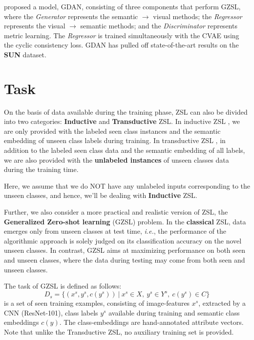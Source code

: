 \documentclass{article}
\begin{document}
\citet{changhu} proposed a model, GDAN, consisting of three components that perform GZSL, where 
the \textit{Generator} represents the semantic $\rightarrow$ visual methods; 
the \textit{Regressor} represents the visual $\rightarrow$ semantic methods; and 
the \textit{Discriminator} represents metric learning. The \textit{Regressor} is trained simultaneously with the CVAE using the cyclic consistency loss.
GDAN has pulled off state-of-the-art results on the \textbf{SUN} \citep{sun} dataset. 



\section{Task}
\label{task}
On the basis of data available during the training phase, ZSL can also be divided into two categories: \textbf{Inductive} and \textbf{Transductive} ZSL. 
In inductive ZSL \citep{sabr10, sabr14, sabr12, sabr17, sabr23, sabr29, sabr3, sabr25}, we are only provided with the labeled seen class instances and the semantic embedding of unseen class labels during training. 
In transductive ZSL \citep{sabr21, sabr28}, in addition to the labeled seen class data and the semantic embedding of all labels, 
we are also provided with the \textbf{unlabeled instances} of unseen classes data during the training time.

Here, we assume that we do NOT have any unlabeled inputs corresponding to the unseen classes, and hence, we'll be dealing with \textbf{Inductive} ZSL.

Further, we also consider a more practical and realistic version of ZSL, the \textbf{Generalized Zero-shot learning} (GZSL) problem. 
In the \textbf{classical} ZSL, data emerges only from unseen classes at test time, 
\textit{i.e.}, the performance of the algorithmic approach is solely judged on its classification accuracy on the novel unseen classes. 
In contrast, GZSL aims at maximizing performance on both seen and unseen classes, where the data during testing may come from both seen and unseen classes.

The task of GZSL is defined as follows:
\begin{equation}
D_s = \{(x^s, y^s, c(y^s))~|~x^s \in X,~ y^s \in Y^s, ~c(y^s) \in C\}
\end{equation}
is a set of seen training examples, consisting of image-features $x^s$, extracted by a CNN (ResNet-101), 
class labels $y^s$ available during training and semantic class embeddings $c(y)$. 
The class-embeddings are hand-annotated attribute vectors. Note that unlike the Transductive ZSL, no auxiliary training set is provided.
\end{document}

